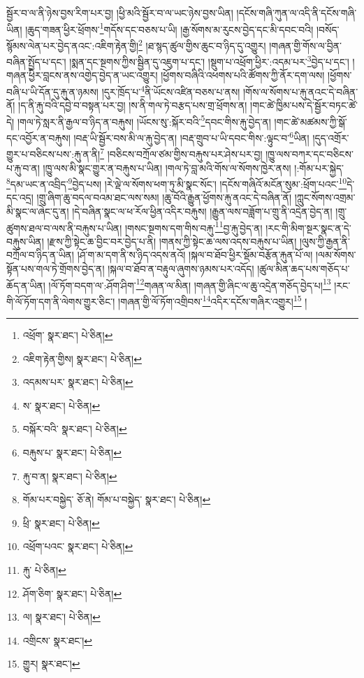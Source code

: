 སྦྱོར་བ་ལ་ནི་ཉེས་བྱས་རིག་པར་བྱ། །ཕྱི་མའི་སྦྱོར་བ་ལ་ཡང་ཉེས་བྱས་ཡིན། །དངོས་གཞི་ཀུན་ལ་འདི་ནི་དངོས་གཞི་ཡིན། །ཆུད་གཟན་ཕྱིར་ཕྲོགས་\footnote{འཕྲོག་  སྣར་ཐང་།  པེ་ཅིན། }གདོས་དང་བཅས་པ་ཡི། །རྒྱ་སོགས་མ་རུངས་བྱེད་དང་མི་དབང་བའི། །བསོད་སྙོམས་ལེན་པར་བྱེད་ནའང་:འཇིག་རྟེན་གྱི།\footnote{འཇིག་རྟེན་གྱིས།  སྣར་ཐང་།  པེ་ཅིན། } །ཐ་སྙད་ཚུལ་གྱིས་ཆུང་བ་ཉིད་དུ་འགྱུར། །གཞན་གྱི་གོས་ལ་བྱིན་བཞིན་སྤྱོད་པ་དང་། །སྨན་དང་སྔགས་ཀྱིས་སྦྱིན་དུ་འཇུག་པ་དང་། །སྡུག་པ་འཕྲོག་ཕྱིར་:འདམ་པར་\footnote{འདམས་པར་  སྣར་ཐང་།  པེ་ཅིན། }བྱེད་པ་དང་། །གཞན་ཕྱིར་བླངས་ནས་འགྱེད་བྱེད་ན་ཡང་འགྱུར། །ཕྱོགས་བཞིའི་འཕགས་པའི་ཚོགས་ཀྱི་ནོར་དག་ལས། །ཕྱོགས་བཞི་པ་ཡི་དོན་དུ་རྐུ་ན་ཉམས། །དུར་ཁྲོད་པ་\footnote{ས་  སྣར་ཐང་།  པེ་ཅིན། }ནི་ཡོངས་འཛིན་བཅས་པ་ནས། །གོས་ལ་སོགས་པ་རྐུ་ནའང་དེ་བཞིན་ནོ། །ད་ནི་རྐུ་བའི་དབྱེ་བ་བསྟན་པར་བྱ། །ས་ནི་གལ་ཏེ་བརྩད་པས་གྲ་ཕྲོགས་ན། །གང་ཚེ་ཁྱིམ་པས་དེ་སྦྱོར་བཏང་ཚེ་དེ། །གལ་ཏེ་སླར་ནི་རྒྱལ་བ་ཉིད་ན་བརྐུས། །ཡོངས་སུ་:སྐོར་བའི་\footnote{བསྐོར་བའི་  སྣར་ཐང་།  པེ་ཅིན། }དབང་གིས་རྐུ་བྱེད་ན། །གང་ཚེ་མཚམས་ཀྱི་སྒོ་དང་འབྱོར་ན་བརྐུས། །བརྡ་ཡི་སྦྱོར་བས་མི་ལ་རྐུ་བྱེད་ན། །བརྡ་གྲུབ་པ་ཡི་དབང་གིས་:ལྟུང་བ་\footnote{བརྐུས་པ་  སྣར་ཐང་།  པེ་ཅིན། }ཡིན། །དུད་འགྲོར་གྱུར་པ་བཅིངས་པས་:རྐུ་ན་ནི།\footnote{རྐུ་བ་ན།  སྣར་ཐང་།  པེ་ཅིན། } །བཅིངས་བཀྲོལ་ཙམ་གྱིས་བརྐུས་པར་ཤེས་པར་བྱ། །ཁྱུ་ལས་བཀར་དང་བཅིངས་པ་རྐུ་བ་ན། །ཁྱུ་ལས་མི་སྣང་གྱུར་ན་བརྐུས་པ་ཡིན། །གལ་ཏེ་བླ་མའི་གོས་ལ་སོགས་ཁྱེར་ནས། །:གོམ་པར་སྐྱེད་\footnote{གོམ་པར་བསྐྱེད་  ཅོ་ནེ། གོམ་པ་བསྐྱེད་  སྣར་ཐང་།  པེ་ཅིན། }དམ་ཡང་ན་འབྲིད་\footnote{ཕྲི་  སྣར་ཐང་།  པེ་ཅིན། }བྱེད་པས། །རེ་ལྡེ་ལ་སོགས་ཕག་ཏུ་མི་སྣང་སོང་། །དངོས་གཞིའོ་མངོན་སུམ་:ཕྲོག་པའང་\footnote{འཕྲོག་པའང་  སྣར་ཐང་།  པེ་ཅིན། }དེ་དང་འདྲ། །གྲུ་ཞིག་ཆུ་བདལ་བའམ་ཐང་ལས་སམ། །ཆུ་བོའི་རྒྱུན་ཕྱོགས་རྐུ་ནའང་དེ་བཞིན་ནོ། །ཀླུང་སོགས་འགྲམ་མི་སྣང་ལ་ཞེང་དུ་ན། །དེ་བཞིན་སྣང་ལ་ཕ་རོལ་ཕྱིན་འདིར་བརྐུས། །རྒྱུན་ལས་བཟློག་པ་གྲུ་ནི་འདྲེན་བྱེད་ན། །གྲུ་ཚུགས་ཐལ་བ་ལས་ནི་བརྐུས་པ་ཡིན། །གསང་སྔགས་དག་གིས་བརྐུ་\footnote{རྐུ་  པེ་ཅིན། }བྱ་རྐུ་བྱེད་ན། །རང་གི་མིག་སྔར་སྣང་ན་དེ་བརྐུས་ཡིན། །རྫས་ཀྱི་སྟེང་ཆ་བྱིང་བར་བྱེད་པ་ནི། །གནས་ཀྱི་སྟེང་ཆ་ལས་འདས་བརྐུས་པ་ཡིན། །ལུས་ཀྱི་རྒྱན་ནི་བཀྲོལ་བ་ཉིད་ན་ཡིན། །ཤོ་ག་མ་དག་ནི་ས་ཉིད་འདས་ནའོ། །སྐལ་བ་ཐོབ་ཕྱིར་སྡོམ་བརྩོན་རྐུན་པོ་ལ། །ལམ་སོགས་སྟོན་པས་གལ་ཏེ་གྲོགས་བྱེད་ན། །སྐལ་བ་ཐོབ་ན་བརྟུལ་ཞུགས་ཉམས་པར་འདོད། །ཚུལ་མིན་ཆད་པས་གཅོད་པ་ཆོད་ན་ཡིན། །ལོ་ཏོག་བདག་ལ་:ཤོག་ཤིག་\footnote{ཤོག་ཅིག་  སྣར་ཐང་།  པེ་ཅིན། }གཞན་ལ་མིན། །གཞན་གྱི་ཞིང་ལ་ཆུ་འདྲེན་གཅོད་བྱེད་པ།\footnote{ལ།  སྣར་ཐང་།  པེ་ཅིན། } །རང་གི་ལོ་ཏོག་དག་ནི་ལེགས་གྱུར་ཅིང་། །གཞན་གྱི་ལོ་ཏོག་འགྲིབས་\footnote{འགྲིངས་  སྣར་ཐང་། }འདིར་དངོས་གཞིར་འགྱུར།\footnote{གྱུར།  སྣར་ཐང་། } །
